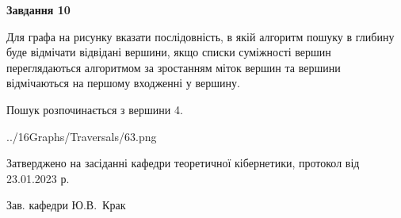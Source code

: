 \documentclass[12pt, ukrainian]{article}
\begin{document}
{\begin {large}
{\begin {center}\textbf{Завдання 10}\end {center}}\par
Для графа на рисунку вказати послідовність, в якій алгоритм пошуку в глибину буде відмічати відвідані вершини, якщо списки суміжності вершин переглядаються алгоритмом за зростанням міток вершин та вершини відмічаються на першому вход\-женні у вершину.\par
Пошук розпочинається з вершини 4.\par

\begin{center}
	{../16Graphs/Traversals/63.png}
\end{center}\par
\newpage


\end {large}
}
{\smallskip \begin {small} Затверджено на засіданні кафедри теоретичної кібернетики, протокол  від   23.01.2023 р.\par\smallskip\smallskip
{\parbox {6.5 cm}{Зав. кафедри \dotfill Ю.В.~Крак}} \end{small}}
\end{document}
